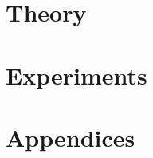 \documentclass[10pt,openany,twoside]{book}
\begin{document}
\frontmatter

\tableofcontents
\mainmatter

\part{Theory}





\part{Experiments}





\part{Appendices}

\appendix



\backmatter
\end{document}
